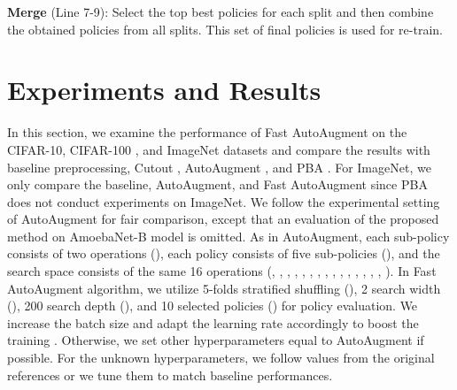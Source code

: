 \documentclass{article}
\begin{document}
\textbf{Merge} (Line 7-9): Select the top  best policies for each split and then combine the obtained policies from all splits. This set of final policies is used for re-train.



\section{Experiments and Results}
\label{sec:experiment}


In this section, we examine the performance of Fast AutoAugment on the CIFAR-10, CIFAR-100 \cite{cifar}, and ImageNet \cite{imagenet} datasets and compare the results with baseline preprocessing, Cutout \cite{devries2017cutout}, AutoAugment \cite{cubuk2018autoaugment}, and PBA \cite{ho2019pba}. For ImageNet, we only compare the baseline, AutoAugment, and Fast AutoAugment since PBA does not conduct experiments on ImageNet. We follow the experimental setting of AutoAugment for fair comparison, except that an evaluation of the proposed method on AmoebaNet-B model \cite{real2018regularized} is omitted. As in AutoAugment, each sub-policy consists of two operations (), each policy consists of five sub-policies (), and the search space consists of the same 16 operations (, , , , , , , , , , , , , , , ). In Fast AutoAugment algorithm, we utilize 5-folds stratified shuffling (), 2 search width (), 200 search depth (), and 10 selected policies () for policy evaluation. We increase the batch size and adapt the learning rate accordingly to boost the training \cite{you2017large}. Otherwise, we set other hyperparameters equal to AutoAugment if possible. For the unknown hyperparameters, we follow values from the original references or we tune them to match baseline performances. 
\end{document}
